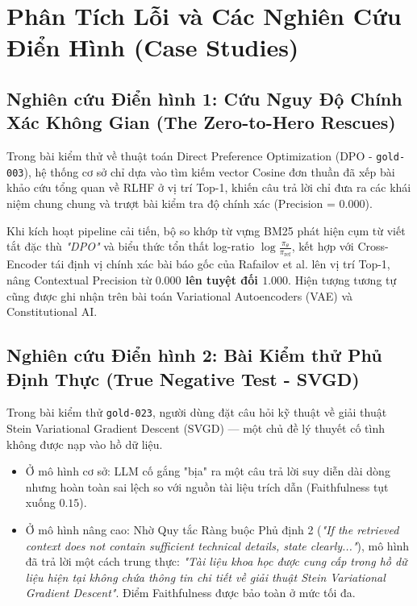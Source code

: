 \section{Phân Tích Lỗi và Các Nghiên Cứu Điển Hình (Case Studies)}

\subsection{Nghiên cứu Điển hình 1: Cứu Nguy Độ Chính Xác Không Gian (The Zero-to-Hero Rescues)}
Trong bài kiểm thử về thuật toán Direct Preference Optimization (DPO - \texttt{gold-003}), hệ thống cơ sở chỉ dựa vào tìm kiếm vector Cosine đơn thuần đã xếp bài khảo cứu tổng quan về RLHF ở vị trí Top-1, khiến câu trả lời chỉ đưa ra các khái niệm chung chung và trượt bài kiểm tra độ chính xác (Precision = 0.000). 

Khi kích hoạt pipeline cải tiến, bộ so khớp từ vựng BM25 phát hiện cụm từ viết tắt đặc thù \textit{"DPO"} và biểu thức tổn thất log-ratio $\log \frac{\pi_\theta}{\pi_{\text{ref}}}$, kết hợp với Cross-Encoder tái định vị chính xác bài báo gốc của Rafailov et al. lên vị trí Top-1, nâng Contextual Precision từ \textbf{$0.000$ lên tuyệt đối $1.000$}. Hiện tượng tương tự cũng được ghi nhận trên bài toán Variational Autoencoders (VAE) và Constitutional AI.

\subsection{Nghiên cứu Điển hình 2: Bài Kiểm thử Phủ Định Thực (True Negative Test - SVGD)}
Trong bài kiểm thử \texttt{gold-023}, người dùng đặt câu hỏi kỹ thuật về giải thuật Stein Variational Gradient Descent (SVGD) --- một chủ đề lý thuyết cố tình không được nạp vào hồ dữ liệu. 
\begin{itemize}
  \item Ở mô hình cơ sở: LLM cố gắng "bịa" ra một câu trả lời suy diễn dài dòng nhưng hoàn toàn sai lệch so với nguồn tài liệu trích dẫn (Faithfulness tụt xuống $0.15$).
  \item Ở mô hình nâng cao: Nhờ Quy tắc Ràng buộc Phủ định 2 (\textit{"If the retrieved context does not contain sufficient technical details, state clearly..."}), mô hình đã trả lời một cách trung thực: \textit{"Tài liệu khoa học được cung cấp trong hồ dữ liệu hiện tại không chứa thông tin chi tiết về giải thuật Stein Variational Gradient Descent"}. Điểm Faithfulness được bảo toàn ở mức tối đa.
\end{itemize}

